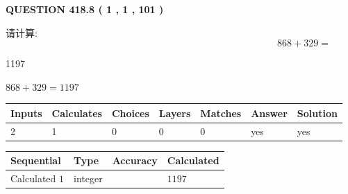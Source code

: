 \documentclass{ctexart}
\begin{document}
   
  
\vspace{0.2in}
  
{\textbf{\Large{QUESTION
418.8 
 ( 1 , 1 , 101 )
}}}
  
  
 
请计算:
\begin{equation}
868 +  %
329 = \nonumber
\end{equation}
 
 
 
\noindent{}
 
 

1197
 
 
\noindent{}
 
 

 
 
 
\noindent{}
 
 

$ %
868 +  %
329=   %
1197$
 
 
\noindent{}
 
 

 
   
   
   
   
\noindent\begin{tabular}{|l|l|l|l|l|l|l|}
 \hline
Inputs & Calculates & Choices & Layers & Matches & Answer & Solution \\ \hline
 2  & 
 1  & 
 0
  & 
 0  & 
 0  & 
  yes & 
  yes 
  \\ \hline
 \end{tabular}
   
   
   
   
\noindent{}
   
   
  
  
\noindent\begin{tabular}{|l|l|l|l|}
\hline
 Sequential & Type & Accuracy & Calculated \\ 
\hline
 
 
  Calculated $  1 $ & integer &  & 
  $ 1197 $ 
 \\  \hline  
 \end{tabular}
   
\end{document}
